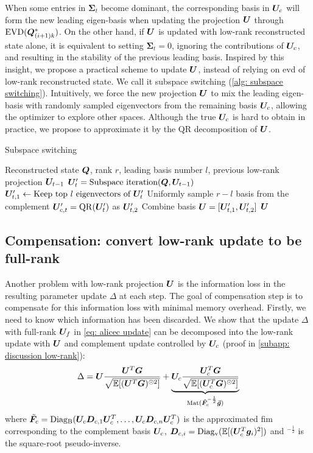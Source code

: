 When some entries in $\bm{\Sigma}_t$ become dominant, the corresponding basis in ${\bm{U}}_c$ will form the new leading eigen-basis when updating the projection ${\bm{U}}$ through $\operatorname{EVD}({\bm{Q}}_{(i+1)k}^*)$. On the other hand, if ${\bm{U}}$ is updated with low-rank reconstructed state alone, it is equivalent to setting $\bm{\Sigma}_t=0$, ignoring the contributions of ${\bm{U}}_c$, and resulting in the stability of the previous leading basis. 
Inspired by this insight, we propose a practical scheme to update ${\bm{U}}$, instead of relying on \gls{evd} of low-rank reconstructed state. We call it subspace switching (\cref{alg: subspace switching}). Intuitively, we force the new projection ${\bm{U}}$ to mix the leading eigen-basis with randomly sampled eigenvectors from the remaining basis ${\bm{U}}_c$, allowing the optimizer to explore other spaces. Although the true ${\bm{U}}_c$ is hard to obtain in practice, we propose to approximate it by the QR decomposition of ${\bm{U}}$. 

\begin{algorithm}
    \caption{Subspace switching}
    \label{alg: subspace switching}
    \begin{algorithmic}[1]
         Reconstructed state ${\bm{Q}}$, rank $r$, leading basis number $l$, previous low-rank projection ${\bm{U}}_{t-1}$
        \STATE ${\bm{U}}_t'=\text{Subspace iteration}({\bm{Q}}, {\bm{U}}_{t-1})$
        \STATE ${\bm{U}}'_{t,1}\leftarrow \text{Keep top $l$ eigenvectors of }{\bm{U}}'_t$ 
        \STATE Uniformly sample $r-l$ basis from the complement ${\bm{U}}'_{c,t} = \operatorname{QR}({\bm{U}}'_{t})$ as ${\bm{U}}'_{t,2}$
        \STATE Combine basis ${\bm{U}} = [{\bm{U}}'_{t,1},{\bm{U}}'_{t,2}]$
         ${\bm{U}}$
    \end{algorithmic}
\end{algorithm}

\subsection{Compensation: convert low-rank update to be full-rank}
\label{subsec: compensation}
Another problem with low-rank projection ${\bm{U}}$ is the information loss in the resulting parameter update $\Delta$ at each step. The goal of compensation step is to compensate for this information loss with minimal memory overhead. Firstly, we need to know which information has been discarded. We show that the update $\Delta$ with full-rank ${\bm{U}}_{f}$ in \cref{eq: alicec update} can be decomposed into the low-rank update with ${\bm{U}}$ and complement update controlled by ${\bm{U}}_{c}$ (proof in \cref{subapp: discussion low-rank}):
\begin{align}
    \Delta ={\bm{U}}\frac{{\bm{U}}^T{\bm{G}}}{\sqrt{\mathbb{E}[({\bm{U}}^T{\bm{G}})^{\odot 2}]}}
    + \underbrace{{\bm{U}}_{c}\frac{{\bm{U}}_{c}^T{\bm{G}}}{\sqrt{\mathbb{E}[({\bm{U}}_{c}^T{\bm{G}})^{\odot 2}]}}}_{\operatorname{Mat}(\tilde{\bm{F}}_{c}^{-\frac{1}{2}}\vec{\bm{g}})}
    \label{eq: alice update decomposition}
\end{align}
where $\tilde{\bm{F}}_{c}=\operatorname{Diag_B}({\bm{U}}_{c}{\bm{D}}_{c,1}{\bm{U}}_{c}^T,\ldots, {\bm{U}}_{c}{\bm{D}}_{c,n}{\bm{U}}_{c}^T)$ is the approximated \gls{fim} corresponding to the complement basis ${\bm{U}}_c$, ${\bm{D}}_{c,i}=\operatorname{Diag_v}(\mathbb{E}[({\bm{U}}_c^T{\bm{g}}_i)^2])$ and $^{-\frac{1}{2}}$ is the square-root pseudo-inverse. 

